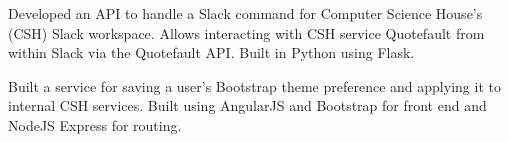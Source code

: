 \documentclass[10pt,a4paper]{altacv}
\begin{document}
\divider

Developed an API to handle a Slack command for Computer Science House's (CSH) Slack workspace.
Allows interacting with CSH service Quotefault from within Slack via the Quotefault API.
Built in Python using Flask.

\divider

Built a service for saving a user's Bootstrap theme preference and applying it to internal CSH services.
Built using AngularJS and Bootstrap for front end and NodeJS Express for routing.

%

\clearpage
\end{document}
